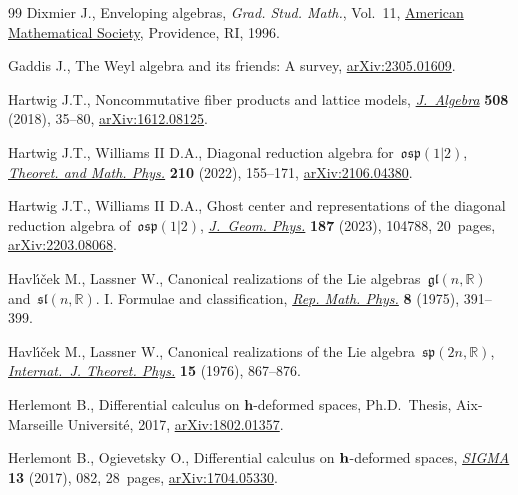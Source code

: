 \begin{thebibliography}{99}
Dixmier J., Enveloping algebras, \textit{Grad. Stud. Math.}, Vol.~11, \href{https://doi.org/10.1090/gsm/011}{American
 Mathematical Society}, Providence, RI, 1996.

Gaddis J., The {W}eyl algebra and its friends: {A} survey, \href{https://arxiv.org/abs/2305.01609}{arXiv:2305.01609}.

Hartwig J.T., Noncommutative fiber products and lattice models,
 \href{https://doi.org/10.1016/j.jalgebra.2018.04.015}{\textit{J.~Algebra}} \textbf{508} (2018), 35--80, \href{https://arxiv.org/abs/1612.08125}{arXiv:1612.08125}.

Hartwig J.T., Williams II D.A., Diagonal reduction algebra
 for~{$\mathfrak{osp}(1|2)$}, \href{https://doi.org/10.1134/S0040577922020015}{\textit{Theoret. and Math. Phys.}} \textbf{210}
 (2022), 155--171, \href{https://arxiv.org/abs/2106.04380}{arXiv:2106.04380}.

Hartwig J.T., Williams II D.A., Ghost center and representations of the
 diagonal reduction algebra of~{$\mathfrak{osp}(1|2)$}, \href{https://doi.org/10.1016/j.geomphys.2023.104788}{\textit{J.~Geom.
 Phys.}} \textbf{187} (2023), 104788, 20~pages, \href{https://arxiv.org/abs/2203.08068}{arXiv:2203.08068}.

Havl\'{\i}\v{c}ek M., Lassner W., Canonical realizations of the {L}ie
 algebras~{$\mathfrak{gl}(n,\mathbb{R})$} and~{$\mathfrak{sl}(n,\mathbb{R})$}.
 {I}. {F}ormulae and classification, \href{https://doi.org/10.1016/0034-4877(75)90081-6}{\textit{Rep. Math. Phys.}}
 \textbf{8} (1975), 391--399.

Havl\'{\i}\v{c}ek M., Lassner W., Canonical realizations of the {L}ie
 algebra~{$\mathfrak{sp}(2n, \mathbb{R})$}, \href{https://doi.org/10.1007/BF01807449}{\textit{Internat.~J. Theoret.
 Phys.}} \textbf{15} (1976), 867--876.

Herlemont B., Differential calculus on $\mathbf{h}$-deformed spaces, Ph.D.~Thesis, {A}ix-Marseille {U}niversit\'e, 2017, \href{https://arxiv.org/abs/1802.01357}{arXiv:1802.01357}.

Herlemont B., Ogievetsky O., Differential calculus on {$\bf h$}-deformed
 spaces, \href{https://doi.org/10.3842/SIGMA.2017.082}{\textit{SIGMA}} \textbf{13} (2017), 082, 28~pages,
 \href{https://arxiv.org/abs/1704.05330}{arXiv:1704.05330}.


\end{thebibliography}
